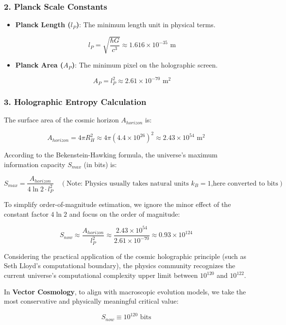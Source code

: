 \subsubsection{2. Planck Scale Constants}

\begin{itemize}
\item \textbf{Planck Length ($l_P$)}: The minimum length unit in physical terms.

    $$l_P = \sqrt{\frac{\hbar G}{c^3}} \approx 1.616 \times 10^{-35} \text{ m}$$

\item \textbf{Planck Area ($A_P$)}: The minimum pixel on the holographic screen.

    $$A_P = l_P^2 \approx 2.61 \times 10^{-70} \text{ m}^2$$
\end{itemize}

\subsubsection{3. Holographic Entropy Calculation}

The surface area of the cosmic horizon $A_{horizon}$ is:

$$A_{horizon} = 4\pi R_H^2 \approx 4\pi (4.4 \times 10^{26})^2 \approx 2.43 \times 10^{54} \text{ m}^2$$

According to the Bekenstein-Hawking formula, the universe's maximum information capacity $S_{max}$ (in bits) is:

$$S_{max} = \frac{A_{horizon}}{4 \ln 2 \cdot l_P^2} \quad (\text{Note: Physics usually takes natural units } k_B=1 \text{,here converted to bits})$$

To simplify order-of-magnitude estimation, we ignore the minor effect of the constant factor $4 \ln 2$ and focus on the order of magnitude:

$$S_{now} \approx \frac{A_{horizon}}{l_P^2} \approx \frac{2.43 \times 10^{54}}{2.61 \times 10^{-70}} \approx 0.93 \times 10^{124}$$

Considering the practical application of the cosmic holographic principle (such as Seth Lloyd's computational boundary), the physics community recognizes the current universe's computational complexity upper limit between \textbf{$10^{120}$} and \textbf{$10^{122}$}.

In \textbf{Vector Cosmology}, to align with macroscopic evolution models, we take the most conservative and physically meaningful critical value:

\textbf{$$S_{now} \equiv 10^{120} \text{ bits}$$}

